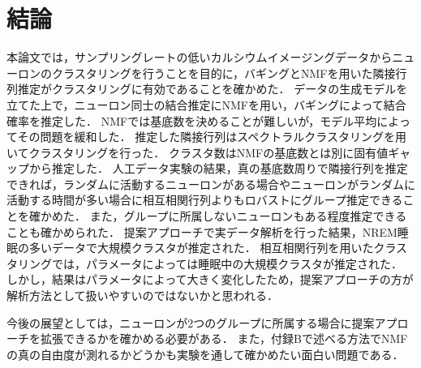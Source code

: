 \chapter{結論}
本論文では，サンプリングレートの低いカルシウムイメージングデータからニューロンのクラスタリングを行うことを目的に，バギングとNMFを用いた隣接行列推定がクラスタリングに有効であることを確かめた．
データの生成モデルを立てた上で，ニューロン同士の結合推定にNMFを用い，バギングによって結合確率を推定した．
NMFでは基底数を決めることが難しいが，モデル平均によってその問題を緩和した．
推定した隣接行列はスペクトラルクラスタリングを用いてクラスタリングを行った．
クラスタ数はNMFの基底数とは別に固有値ギャップから推定した．
人工データ実験の結果，真の基底数周りで隣接行列を推定できれば，ランダムに活動するニューロンがある場合やニューロンがランダムに活動する時間が多い場合に相互相関行列よりもロバストにグループ推定できることを確かめた．
また，グループに所属しないニューロンもある程度推定できることも確かめられた．
提案アプローチで実データ解析を行った結果，NREM睡眠の多いデータで大規模クラスタが推定された．
相互相関行列を用いたクラスタリングでは，パラメータによっては睡眠中の大規模クラスタが推定された．
しかし，結果はパラメータによって大きく変化したため，提案アプローチの方が解析方法として扱いやすいのではないかと思われる．

今後の展望としては，ニューロンが2つのグループに所属する場合に提案アプローチを拡張できるかを確かめる必要がある．
また，付録Bで述べる方法でNMFの真の自由度が測れるかどうかも実験を通して確かめたい面白い問題である．
